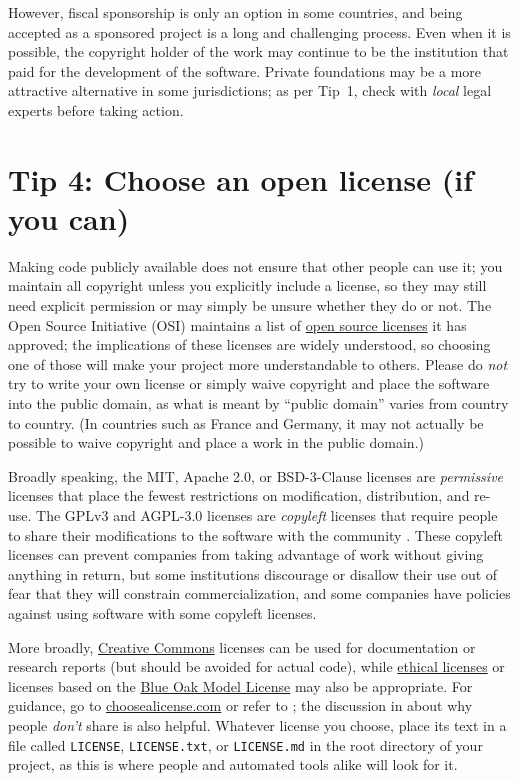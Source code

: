 \documentclass[10pt,letterpaper]{article}
\begin{document}
However, fiscal sponsorship is only an option in some countries, and being accepted as a sponsored project is a long and challenging process.
Even when it is possible, the copyright holder of the work may continue to be the institution that paid for the development of the software.
Private foundations may be a more attractive alternative in some jurisdictions; as per Tip~1, check with \emph{local} legal experts before taking action.

\section*{Tip 4: Choose an open license (if you can)}

Making code publicly available does not ensure that other people can use it; you maintain all copyright unless you explicitly include a license, so they may still need explicit permission or may simply be unsure whether they do or not.
The Open Source Initiative (OSI) maintains a list of \href{https://opensource.org/licenses}{open source licenses} it has approved; the implications of these licenses are widely understood, so choosing one of those will make your project more understandable to others.
Please do \emph{not} try to write your own license or simply waive copyright and place the software into the public domain,
as what is meant by ``public domain'' varies from country to country. (In countries such as France and Germany, it may not actually be possible to waive copyright and place a work in the public domain.)

Broadly speaking, the MIT, Apache 2.0, or BSD-3-Clause licenses are \emph{permissive} licenses
that place the fewest restrictions on modification, distribution, and re-use.
The GPLv3 and AGPL-3.0 licenses are \emph{copyleft} licenses that require people to share their modifications to the software with the community \cite{Morin2012}.
These copyleft licenses can prevent companies from taking advantage of work without giving anything in return, but some institutions discourage or disallow their use out of fear that they will constrain commercialization, and some companies have policies against using software with some copyleft licenses.

More broadly, \href{https://creativecommons.org/}{Creative Commons} licenses can be used for documentation or research reports (but should be avoided for actual code),
while \href{https://ethicalsource.dev/}{ethical licenses}
or licenses based on the \href{https://blueoakcouncil.org/license/1.0.0}{Blue Oak Model License} may also be appropriate.
For guidance,
go to \href{http://choosealicense.com}{choosealicense.com}
or refer to \cite{Fogel2020,Fortunato2021};
the discussion in \cite{Gomes2022} about why people \emph{don't} share is also helpful.
Whatever license you choose, place its text in a file called \texttt{LICENSE}, \texttt{LICENSE.txt}, or \texttt{LICENSE.md} in the root directory of your project, as this is where people and automated tools alike will look for it.
\end{document}
